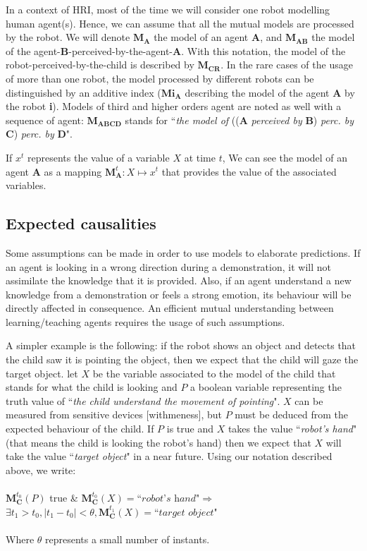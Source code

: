 \documentclass[10pt,a4paper,twocolumn]{article}
\begin{document}
In a context of HRI, most of the time we will consider one robot modelling human agent(s). Hence, we can assume that all the mutual models are processed by the robot. We will denote $\textbf{M}_\textbf{A}$ the model of an agent $\textbf{A}$, and $\textbf{M}_\textbf{AB}$ the model of the agent-\textbf{B}-perceived-by-the-agent-\textbf{A}. With this notation, the model of the robot-perceived-by-the-child is described by $\textbf{M}_\textbf{CR}$. In the rare cases of the usage of more than one robot, the model processed by different robots can be distinguished by an additive index ($\textbf{Mi}_\textbf{A}$ describing the model of the agent \textbf{A} by the robot \textbf{i}). Models of third and higher orders agent are noted as well with a sequence of agent: $\textbf{M}_\textbf{ABCD}$ stands for ``\textit{the model of} ((\textbf{A} \textit{perceived by} \textbf{B}) \textit{perc. by} \textbf{C}) \textit{perc. by} \textbf{D}".

If $x^t$ represents the value of a variable $X$ at time $t$, We can see the model of an agent \textbf{A} as a mapping $\textbf{M}^t_\textbf{A}: X \mapsto x^t$ that provides the value of the associated variables. 

\subsection{Expected causalities}

Some assumptions can be made in order to use models to elaborate predictions. If an agent is looking in a wrong direction during a demonstration, it will not assimilate the knowledge that it is provided. Also, if an agent understand a new knowledge from a demonstration or feels a strong emotion, its behaviour will be directly affected in consequence. An efficient mutual understanding between learning/teaching agents requires the usage of such assumptions.

A simpler example is the following: if the robot shows an object and detects that the child saw it is pointing the object, then we expect that the child will gaze the target object.  let $X$ be the variable associated to the model of the child that stands for what the child is looking and $P$ a boolean variable representing the truth value of ``\textit{the child understand the movement of pointing}". $X$ can be measured from sensitive devices [withmeness], but $P$ must be deduced from the expected behaviour of the child. If $P$ is true and $X$ takes the value ``\textit{robot's hand}" (that means the child is looking the robot's hand) then we expect that $X$ will take the value ``\textit{target object}" in a near future. Using our notation described above, we write:\\
\\
$\textbf{M}^{t_0}_\textbf{C}(P)$ true \& $\textbf{M}^{t_0}_\textbf{C}(X)=\textit{``robot's hand"} \Rightarrow $\\ $\exists t_1>t_0, |t_1-t_0| < \theta, \textbf{M}^{t_1}_\textbf{C}(X)=\textit{``target object"}$\\
\\
Where $\theta$ represents a small number of instants.
\end{document}
